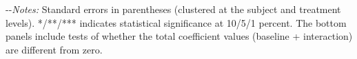 		\item\leavevmode\kern-\scriptspace\kern- \small\textit{Notes:} Standard errors in parentheses (clustered at the subject and treatment levels). */**/*** indicates statistical significance at 10/5/1 percent. The bottom panels include tests of whether the total coefficient values (baseline + interaction) are different from zero.